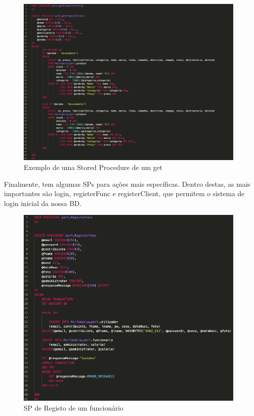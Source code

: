 \documentclass[10pt,portuguese]{article}
\begin{document}
\begin{figure}[!h]
    \centering
    \includegraphics[width=500]{images/getProductFilters.png}
    \caption{Exemplo de uma Stored Procedure de um get}
\end{figure}

\clearpage

\par Finalmente, tem algumas SPs para ações mais específicas. Dentro destas, as mais importantes são login, registerFunc e registerClient, que permitem o sistema de login inicial da nossa BD.

\begin{figure}[!h]
    \centering
    \includegraphics[width=\textwidth]{images/registerFunc.png}
    \caption{SP de Registo de um funcionário}
\end{figure}
\end{document}
